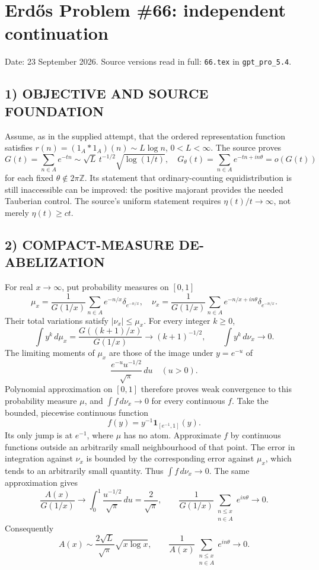 \section{Erd\H{o}s Problem \#66: independent continuation}
\noindent Date: 23 September 2026. Source versions read in full: \texttt{66.tex} in \texttt{gpt\_pro\_5.4}.

\subsection*{1) OBJECTIVE AND SOURCE FOUNDATION}
Assume, as in the supplied attempt, that the ordered representation function satisfies $r(n)=(1_A*1_A)(n)\sim L\log n$, $0<L<\infty$. The source proves
\[
G(t)=\sum_{n\in A}e^{-tn}\sim\sqrt L\,t^{-1/2}\sqrt{\log(1/t)},
\quad G_\theta(t)=\sum_{n\in A}e^{-tn+in\theta}=o(G(t))
\]
for each fixed $\theta\notin2\pi\mathbb Z$. Its statement that ordinary-counting equidistribution is still inaccessible can be improved: the positive majorant provides the needed Tauberian control. The source's uniform statement requires $\eta(t)/t\to\infty$, not merely $\eta(t)\ge c t$.
\subsection*{2) COMPACT-MEASURE DE-ABELIZATION}
For real $x\to\infty$, put probability measures on $[0,1]$
\[
\mu_x=\frac1{G(1/x)}\sum_{n\in A}e^{-n/x}\delta_{e^{-n/x}},
\quad
\nu_x=\frac1{G(1/x)}\sum_{n\in A}e^{-n/x+in\theta}\delta_{e^{-n/x}}.
\]
Their total variations satisfy $|\nu_x|\le\mu_x$. For every integer $k\ge0$,
\[
\int y^k\,d\mu_x=\frac{G((k+1)/x)}{G(1/x)}\longrightarrow(k+1)^{-1/2},
\qquad
\int y^k\,d\nu_x\longrightarrow0.
\]
The limiting moments of $\mu_x$ are those of the image under $y=e^{-u}$ of
\[
\frac{e^{-u}u^{-1/2}}{\sqrt\pi}\,du\quad(u>0).
\]
Polynomial approximation on $[0,1]$ therefore proves weak convergence to this probability measure $\mu$, and $\int f\,d\nu_x\to0$ for every continuous $f$.
Take the bounded, piecewise continuous function
\[
f(y)=y^{-1}\mathbf1_{[e^{-1},1]}(y).
\]
Its only jump is at $e^{-1}$, where $\mu$ has no atom. Approximate $f$ by continuous functions outside an arbitrarily small neighbourhood of that point. The error in integration against $\nu_x$ is bounded by the corresponding error against $\mu_x$, which tends to an arbitrarily small quantity. Thus $\int f\,d\nu_x\to0$. The same approximation gives
\[
\frac{A(x)}{G(1/x)}\longrightarrow\int_0^1\frac{u^{-1/2}}{\sqrt\pi}\,du=\frac2{\sqrt\pi},
\qquad
\frac1{G(1/x)}\sum_{\substack{n\le x\\n\in A}}e^{in\theta}\longrightarrow0.
\]
Consequently
\[
A(x)\sim\frac{2\sqrt L}{\sqrt\pi}\sqrt{x\log x},\qquad
\frac1{A(x)}\sum_{\substack{n\le x\\n\in A}}e^{in\theta}\longrightarrow0.
\]
